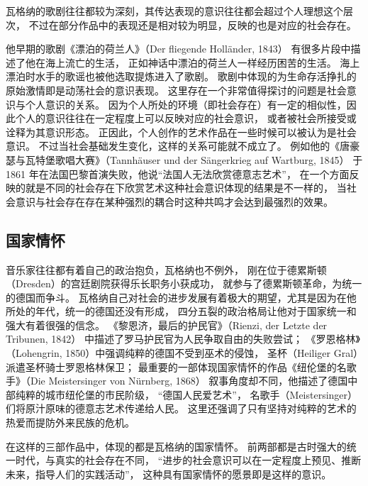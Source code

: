 \documentclass[10pt,a4paper,twocolumn]{article}
\begin{document}
      瓦格纳的歌剧往往都较为深刻，其传达表现的意识往往都会超过个人理想这个层次，
      不过在部分作品中的表现还是相对较为明显，反映的也是对应的社会存在。

      他早期的歌剧《漂泊的荷兰人》（Der fliegende Holländer, 1843）
      有很多片段中描述了他在海上流亡的生活，
      正如神话中漂泊的荷兰人一样经历困苦的生活。
      海上漂泊时水手的歌谣也被他选取提炼进入了歌剧。
      歌剧中体现的为生命存活挣扎的原始激情即是动荡社会的意识表现。
      这里存在一个非常值得探讨的问题是社会意识与个人意识的关系。
      因为个人所处的环境（即社会存在）有一定的相似性，因此个人的意识往往在一定程度上可以反映对应的社会意识，
      或者被社会所接受或诠释为其意识形态。
      正因此，个人创作的艺术作品在一些时候可以被认为是社会意识。
      不过当社会基础发生变化，这样的关系可能就不成立了。
      例如他的《唐豪瑟与瓦特堡歌唱大赛》（Tannhäuser und der Sängerkrieg auf Wartburg, 1845）
      于 1861 年在法国巴黎首演失败，他说``法国人无法欣赏德意志艺术''，
      在一个方面反映的就是不同的社会存在下欣赏艺术这种社会意识体现的结果是不一样的，
      当社会意识与社会存在存在某种强烈的耦合时这种共鸣才会达到最强烈的效果。

    \subsection{国家情怀}

      音乐家往往都有着自己的政治抱负，瓦格纳也不例外，
      刚在位于德累斯顿（Dresden）的宫廷剧院获得乐长职务小获成功，
      就参与了德累斯顿革命，为统一的德国而争斗。
      瓦格纳自己对社会的进步发展有着极大的期望，尤其是因为在他所处的年代，统一的德国还没有形成，
      四分五裂的政治格局让他对于国家统一和强大有着很强的信念\cite{vernon2021disturbing}。
      《黎恩济，最后的护民官》（Rienzi, der Letzte der Tribunen, 1842）
      中描述了罗马护民官为人民争取自由的失败尝试；
      《罗恩格林》（Lohengrin, 1850）中强调纯粹的德国不受到巫术的侵蚀，
      圣杯（Heiliger Gral）派遣圣杯骑士罗恩格林保卫；
      最重要的一部体现国家情怀的作品《纽伦堡的名歌手》（Die Meistersinger von Nürnberg, 1868）
      叙事角度却不同，他描述了德国中部纯粹的城市纽伦堡的市民阶级，
      ``德国人民爱艺术''，
      名歌手（Meistersinger）们将原汁原味的德意志艺术传递给人民。
      这里还强调了只有坚持对纯粹的艺术的热爱而提防外来民族的危机。

      在这样的三部作品中，体现的都是瓦格纳的国家情怀。
      前两部都是古时强大的统一时代，与真实的社会存在不同，
      ``进步的社会意识可以在一定程度上预见、推断未来，指导人们的实践活动''\cite{book}，
      这种具有国家情怀的愿景即是这样的意识。
\end{document}
